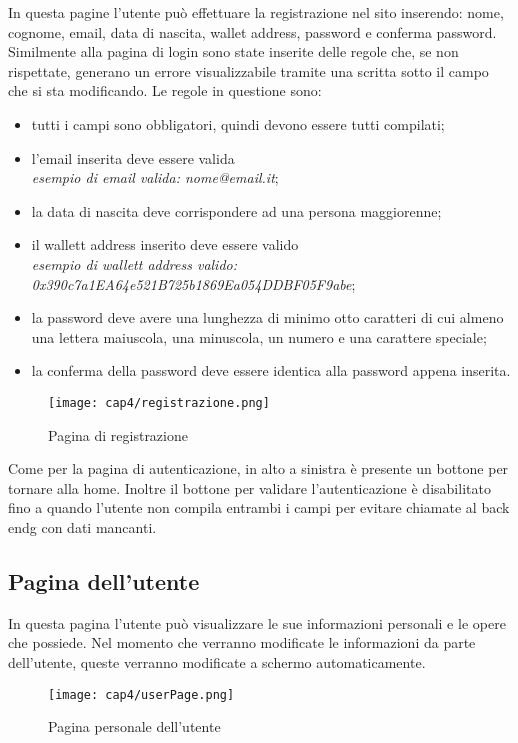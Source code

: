 In questa pagine l'utente può effettuare la registrazione nel sito inserendo: nome, cognome, email, data di nascita, wallet address, password e conferma password. Similmente alla pagina di login sono state inserite delle regole che, se non rispettate, generano un errore visualizzabile tramite una scritta sotto il campo che si sta modificando. Le regole in questione sono:
\begin{itemize}
	\item tutti i campi sono obbligatori, quindi devono essere tutti compilati;
	\item l'email inserita deve essere valida\\
	\textit{esempio di email valida: nome@email.it};
	\item la data di nascita deve corrispondere ad una persona maggiorenne;
	\item il wallett address inserito deve essere valido\\ 
	\textit{esempio di wallett address valido: 0x390c7a1EA64e521B725b1869Ea054DDBF05F9abe};
	\item la password deve avere una lunghezza di minimo otto caratteri di cui almeno una lettera maiuscola, una minuscola, un numero e una carattere speciale;
	\item la conferma della password deve essere identica alla password appena inserita.
\end{itemize}
\begin{figure}[H]
	\begin{center}
		\texttt{[image: cap4/registrazione.png]}
		\caption{Pagina di registrazione}
	\end{center}
\end{figure}
Come per la pagina di autenticazione, in alto a sinistra è presente un bottone per tornare alla home. Inoltre il bottone per validare l'autenticazione è disabilitato fino a quando l'utente non compila entrambi i campi per evitare chiamate al \gls{back endg} con dati mancanti.

\subsection{Pagina dell'utente}
\label{subsec:pagina-utente}

In questa pagina l'utente può visualizzare le sue informazioni personali e le opere che possiede. Nel momento che verranno modificate le informazioni da parte dell'utente, queste verranno modificate a schermo automaticamente.
\begin{figure}[H]
	\begin{center}
		\texttt{[image: cap4/userPage.png]}
		\caption{Pagina personale dell'utente}
	\end{center}
\end{figure}

